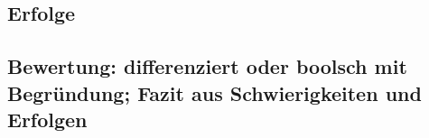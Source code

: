 \documentclass[a4paper, 12pt, hidelinks, listof=totoc, listoftables=totoc, bibliography=totoc]{scrreprt}
\begin{document}
\subsection{Erfolge}


\subsection{Bewertung: differenziert oder boolsch mit Begründung; Fazit aus Schwierigkeiten und Erfolgen}


















%
\end{document}
